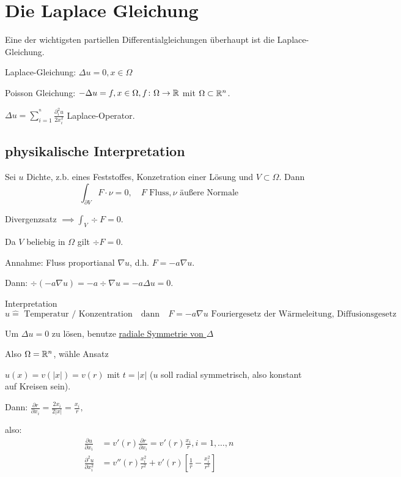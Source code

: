 \section{Die Laplace Gleichung}

Eine der wichtigsten partiellen Differentialgleichungen überhaupt ist die Laplace-Gleichung.

Laplace-Gleichung: $\Delta u = 0, x \in \Omega$

Poisson Gleichung: $-\Delta u = f, x \in \Omega, f \colon \Omega \to \mathbb{R}$
mit $\Omega \subset \mathbb{R}^n$.

$ \Delta u = \sum_{i = 1}^^n \frac{\partial_i^2 u}{2 x_i^2}$ Laplace-Operator.

\subsection{physikalische Interpretation}

Sei $u$ Dichte, z.b. eines Feststoffes, Konzetration einer Lösung und $V \subset \Omega$. Dann
$$
\int_{\partial V} F \cdot \nu = 0, \quad F \text{ Fluss}, \nu \text{ äußere Normale}
$$

Divergenzsatz $\implies \int_V \div F = 0$.

Da $V$ beliebig in $\Omega$ gilt $\div F = 0$.

Annahme: Fluss proportianal $\nabla u$, d.h. $F = -a \nabla u$.

Dann: $\div(-a \nabla u) = - a \div \nabla u = - a \Delta u = 0$.

Interpretation
$$
u \hat = \text{ Temperatur / Konzentration} \quad \text{dann} \quad F = - a \nabla u \text{ Fouriergesetz der Wärmeleitung, Diffusionsgesetz}
$$

Um $\Delta u = 0$ zu lösen, benutze \underline{radiale Symmetrie von $\Delta$}

Also $\Omega = \mathbb{R}^n$, wähle Ansatz

$u(x) = v(|x|) = v(r)$ mit $t = |x|$ ($u$ soll radial symmetrisch, also konstant auf Kreisen sein).

Dann: $\frac{\partial r}{\partial x_i} = \frac{2 x_i}{2 |x|} = \frac{x_i}{r},$

also: 
\begin{align*}
  \frac{\partial u}{\partial x_i} &= v'(r) \frac{\partial r}{\partial x_i} = v'(r) \frac{x_i}{r}, i = 1, \dots, n \\
  \frac{\partial^2 u}{\partial x_i^2} &= v''(r) \frac{x_i^2}{r^2} + v'(r)[\frac{1}{r} - \frac{x_i^2}{r^3}]
\end{align*}

